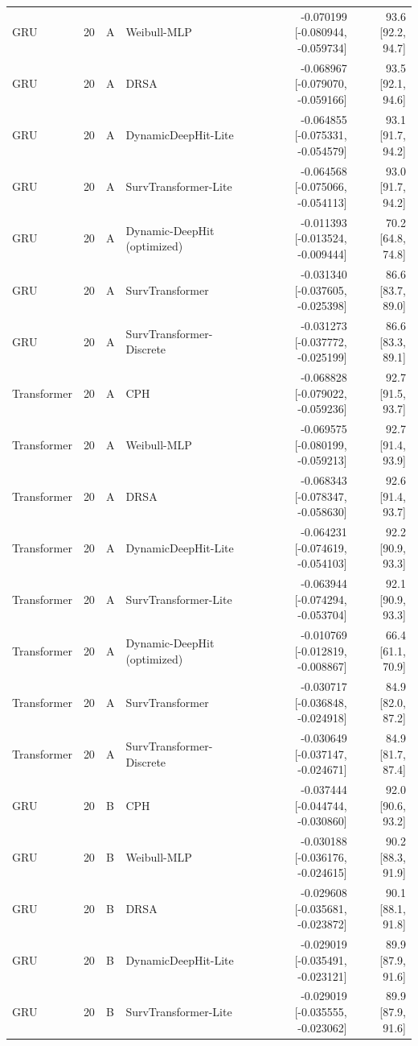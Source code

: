 \begin{longtable}{lll p{3.0cm} rr}
GRU & 20 & A & Weibull-MLP & -0.070199 [-0.080944, -0.059734] & 93.6 [92.2, 94.7]\\
GRU & 20 & A & DRSA & -0.068967 [-0.079070, -0.059166] & 93.5 [92.1, 94.6]\\
GRU & 20 & A & DynamicDeepHit-Lite & -0.064855 [-0.075331, -0.054579] & 93.1 [91.7, 94.2]\\
GRU & 20 & A & SurvTransformer-Lite & -0.064568 [-0.075066, -0.054113] & 93.0 [91.7, 94.2]\\
GRU & 20 & A & Dynamic-DeepHit (optimized) & -0.011393 [-0.013524, -0.009444] & 70.2 [64.8, 74.8]\\
GRU & 20 & A & SurvTransformer & -0.031340 [-0.037605, -0.025398] & 86.6 [83.7, 89.0]\\
GRU & 20 & A & SurvTransformer-Discrete & -0.031273 [-0.037772, -0.025199] & 86.6 [83.3, 89.1]\\
Transformer & 20 & A & CPH & -0.068828 [-0.079022, -0.059236] & 92.7 [91.5, 93.7]\\
Transformer & 20 & A & Weibull-MLP & -0.069575 [-0.080199, -0.059213] & 92.7 [91.4, 93.9]\\
Transformer & 20 & A & DRSA & -0.068343 [-0.078347, -0.058630] & 92.6 [91.4, 93.7]\\
Transformer & 20 & A & DynamicDeepHit-Lite & -0.064231 [-0.074619, -0.054103] & 92.2 [90.9, 93.3]\\
Transformer & 20 & A & SurvTransformer-Lite & -0.063944 [-0.074294, -0.053704] & 92.1 [90.9, 93.3]\\
Transformer & 20 & A & Dynamic-DeepHit (optimized) & -0.010769 [-0.012819, -0.008867] & 66.4 [61.1, 70.9]\\
Transformer & 20 & A & SurvTransformer & -0.030717 [-0.036848, -0.024918] & 84.9 [82.0, 87.2]\\
Transformer & 20 & A & SurvTransformer-Discrete & -0.030649 [-0.037147, -0.024671] & 84.9 [81.7, 87.4]\\
GRU & 20 & B & CPH & -0.037444 [-0.044744, -0.030860] & 92.0 [90.6, 93.2]\\
GRU & 20 & B & Weibull-MLP & -0.030188 [-0.036176, -0.024615] & 90.2 [88.3, 91.9]\\
GRU & 20 & B & DRSA & -0.029608 [-0.035681, -0.023872] & 90.1 [88.1, 91.8]\\
GRU & 20 & B & DynamicDeepHit-Lite & -0.029019 [-0.035491, -0.023121] & 89.9 [87.9, 91.6]\\
GRU & 20 & B & SurvTransformer-Lite & -0.029019 [-0.035555, -0.023062] & 89.9 [87.9, 91.6]\\

\end{longtable}
